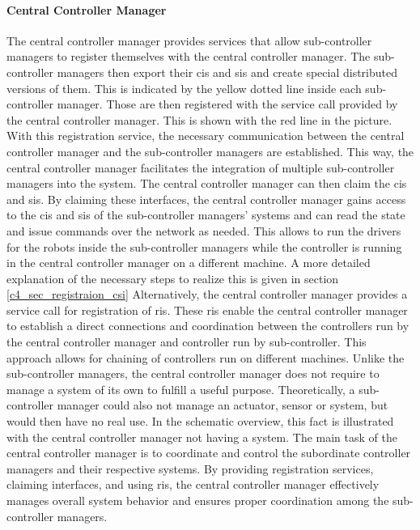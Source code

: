 \paragraph{Central Controller Manager}
The central controller manager provides services that allow sub-controller managers to register themselves with the central controller manager. The sub-controller managers then export their \glspl{ci} and \glspl{si} and create special distributed versions of them. This is indicated by the yellow dotted line inside each sub-controller manager. Those are then registered with the service call provided by the central controller manager. This is shown with the red line in the picture. With this registration service, the necessary communication between the central controller manager and the sub-controller managers are established. This way, the central controller manager facilitates the integration of multiple sub-controller managers into the system.\newline
The central controller manager can then claim the \glspl{ci} and \glspl{si}. By claiming these interfaces, the central controller manager gains access to the \glspl{ci} and \glspl{si} of the sub-controller managers' systems and can read the state and issue commands over the network as needed. This allows to run the drivers for the robots inside the sub-controller managers while the controller is running in the central controller manager on a different machine. A more detailed explanation of the necessary steps to realize this is given in section \ref{c4_sec_registraion_csi}\newline
Alternatively, the central controller manager provides a service call for registration of \glspl{ri}. These \glspl{ri} enable the central controller manager to establish a direct connections and coordination between the controllers run by the central controller manager and controller run by sub-controller. This approach allows for chaining of controllers run on different machines.\newline
Unlike the sub-controller managers, the central controller manager does not require to manage a system of its own to fulfill a useful purpose. Theoretically, a sub-controller manager could also not manage an actuator, sensor or system, but would then have no real use. In the schematic overview, this fact is illustrated with the central controller manager not having a system. The main task of the central controller manager is to coordinate and control the subordinate controller managers and their respective systems. By providing registration services, claiming interfaces, and using \glspl{ri}, the central controller manager effectively manages overall system behavior and ensures proper coordination among the sub-controller managers.
